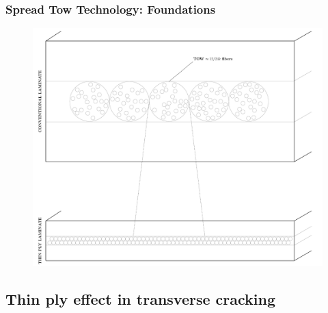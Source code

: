 \documentclass[first,firstsupp,lastsupp,last,hyperref,table]{ETHclass}
\begin{document}
\begin{frame}
\frametitle{\small Spread Tow Technology: Foundations}
\vspace{-0.5cm}
\centering
\begin{figure}
\centering
\includegraphics[height=0.85\textheight]{spread-tow-tech.pdf}
\label{fig:spread-tow-schematic}
\end{figure}
\end{frame}

\subsection{Thin ply effect in transverse cracking}
\end{document}
